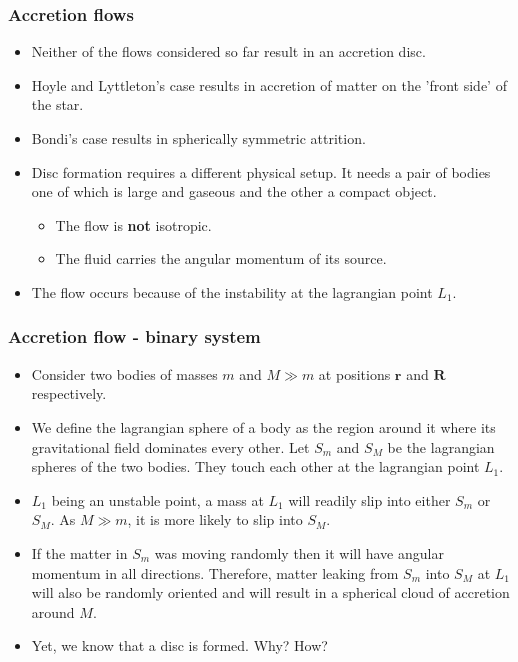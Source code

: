 \documentclass{beamer}
\renewcommand{\vec}{\bm}
\begin{document}
\begin{frame}
\frametitle{Accretion flows}
\begin{itemize}
\item Neither of the flows considered so far result in an accretion disc.
\item Hoyle and Lyttleton's case results in accretion of matter on the 'front side' of the star.
\item Bondi's case results in spherically symmetric attrition.
\item Disc formation requires a different physical setup. It needs a pair of bodies one of which is large and gaseous and the other a compact object.
\begin{itemize}
\item The flow is \textbf{not} isotropic.
\item The fluid carries the angular momentum of its source.
\end{itemize}
\item The flow occurs because of the instability at the lagrangian point $L_1$.
\end{itemize}
\end{frame}

\begin{frame}
\frametitle{Accretion flow - binary system}
\begin{itemize}
\item Consider two bodies of masses $m$ and $M \gg m$ at positions $\vec{r}$ and $\vec{R}$ respectively.
\item We define the lagrangian sphere of a body as the region around it where its gravitational field dominates every other. Let $S_m$ and $S_M$ be the
lagrangian spheres of the two bodies. They touch each other at the lagrangian point $L_1$.
\item $L_1$ being an unstable point, a mass at $L_1$ will readily slip into either $S_m$ or $S_M$. As $M \gg  m$, it is more likely to slip into $S_M$.
\item If the matter in $S_m$ was moving randomly then it will have angular momentum in all directions.  Therefore, matter leaking from $S_m$ into $S_M$
at $L_1$ will also be randomly oriented and will result in a spherical cloud of accretion around $M$.
\item Yet, we know that a disc is formed. Why? How?
\end{itemize}
\end{frame}
\end{document}
